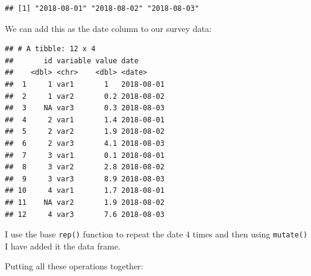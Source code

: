 \documentclass[]{gitbook}
\newenvironment{Shaded}{\begin{snugshade}}{\end{snugshade}}
\newcommand{\DataTypeTok}[1]{\textcolor[rgb]{0.13,0.29,0.53}{#1}}
\newcommand{\DecValTok}[1]{\textcolor[rgb]{0.00,0.00,0.81}{#1}}
\newcommand{\KeywordTok}[1]{\textcolor[rgb]{0.13,0.29,0.53}{\textbf{#1}}}
\newcommand{\NormalTok}[1]{#1}
\newcommand{\OperatorTok}[1]{\textcolor[rgb]{0.81,0.36,0.00}{\textbf{#1}}}
\newcommand{\StringTok}[1]{\textcolor[rgb]{0.31,0.60,0.02}{#1}}
\begin{document}
\begin{verbatim}
## [1] "2018-08-01" "2018-08-02" "2018-08-03"
\end{verbatim}

We can add this as the date column to our survey data:

\begin{Shaded}
\end{Shaded}

\begin{verbatim}
## # A tibble: 12 x 4
##       id variable value date      
##    <dbl> <chr>    <dbl> <date>    
##  1     1 var1       1   2018-08-01
##  2     1 var2       0.2 2018-08-02
##  3    NA var3       0.3 2018-08-03
##  4     2 var1       1.4 2018-08-01
##  5     2 var2       1.9 2018-08-02
##  6     2 var3       4.1 2018-08-03
##  7     3 var1       0.1 2018-08-01
##  8     3 var2       2.8 2018-08-02
##  9     3 var3       8.9 2018-08-03
## 10     4 var1       1.7 2018-08-01
## 11    NA var2       1.9 2018-08-02
## 12     4 var3       7.6 2018-08-03
\end{verbatim}

I use the base \texttt{rep()} function to repeat the date 4 times and then using \texttt{mutate()} I have added
it the data frame.

Putting all these operations together:

\begin{Shaded}
\end{Shaded}
\end{document}
